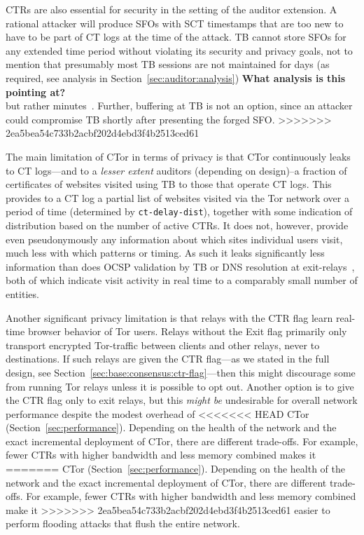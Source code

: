 CTRs are also essential for security in the setting of the auditor extension. A
rational attacker will produce SFOs with SCT timestamps that are too new to have
to be part of CT logs at the time of the attack. TB cannot store SFOs for any
extended time period without violating its security and privacy goals, not to
mention that presumably most TB sessions are not maintained for
days (as required, see analysis in Section~\ref{sec:auditor:analysis}) 
{\bf \color{red} What analysis is this pointing at?}\\
but rather minutes~\cite{DBLP:conf/pam/AmannS16}. Further, buffering
at TB is not an option, since an attacker could compromise TB shortly
after presenting the forged SFO.
>>>>>>> 2ea5bea54c733b2acbf202d4ebd3f4b2513ced61

The main limitation of CTor in terms of privacy is that CTor continuously leaks
to CT logs---and to a \emph{lesser extent} auditors (depending on design)--a
fraction of certificates of websites visited using TB to those that operate CT
logs. This provides to a CT log a partial list of websites visited via the Tor
network over a period of time (determined by \texttt{ct-delay-dist}), together
with some indication of distribution based on the number of active CTRs. It does
not, however, provide even pseudonymously any information about which sites
individual users visit, much less with which patterns or timing. As such it
leaks significantly less information than does OCSP validation by TB or DNS
resolution at exit-relays~\cite{TorDNS}, both of which indicate visit activity
in real time to a comparably small number of entities.

Another significant privacy limitation is that relays with the CTR flag learn
real-time browser behavior of Tor users. Relays without the Exit flag primarily
only transport encrypted Tor-traffic between clients and other relays, never to
destinations. If such relays are given the CTR flag---as we stated in the full
design, see Section~\ref{sec:base:consensus:ctr-flag}---then this might
discourage some from running Tor relays unless it is possible to opt out.
Another option is to give the CTR flag only to exit relays, but this \emph{might
be} undesirable for overall network performance despite the modest overhead of
<<<<<<< HEAD
CTor (Section~\ref{sec:performance}). Depending on the health of the network and
the exact incremental deployment of CTor, there are different trade-offs. For
example, fewer CTRs with higher bandwidth and less memory combined makes it
=======
CTor (Section~\ref{sec:performance}). Depending on the health of the network
and the exact incremental deployment of CTor, there are different trade-offs.
For example, fewer CTRs with higher bandwidth and less memory combined make it
>>>>>>> 2ea5bea54c733b2acbf202d4ebd3f4b2513ced61
easier to perform flooding attacks that flush the entire network.
